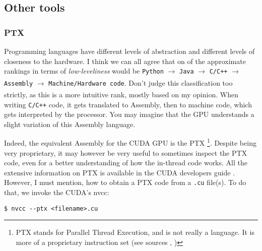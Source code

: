 \subsection{Other tools} 
\subsubsection{PTX}
Programming languages have different levels of abstraction and different levels of closeness to the hardware. 
I think we can all agree that on of the approximate rankings in terms of \textit{low-leveliness} would be 
\verb|Python| $\xrightarrow[]{}$ \verb|Java| $\xrightarrow[]{}$ \verb|C/C++| $\xrightarrow[]{}$ \verb|Assembly| $\xrightarrow[]{}$ \verb|Machine/Hardware code|.
Don't judge this classification too strictly, as this is a more intuitive rank, mostly based on my opinion. 
When writing \verb|C/C++| code, it gets translated to Assembly, then to machine code, which gets interpreted by the processor. 
You may imagine that the GPU understands a slight variation of this Assembly language.

Indeed, the equivalent Assembly for the CUDA GPU is the PTX \footnote{PTX stands for Parallel Thread Execution, and is not really a language. It is more of a proprietary 
instruction set (see sources \cite{ptx_nvidia}, \cite{ptx_wiki})}.
Despite being very proprietary, it may however be very useful to sometimes inspect the PTX code, even for a better understanding 
of how the in-thread code works. All the extensive information on PTX is available in the CUDA developers guide \cite{ptx_nvidia}.
However, I must mention, how to obtain a PTX code from a \verb|.cu| file(s). To do that, we invoke the CUDA's nvcc: 

\begin{verbatim}
$ nvcc --ptx <filename>.cu
\end{verbatim}



